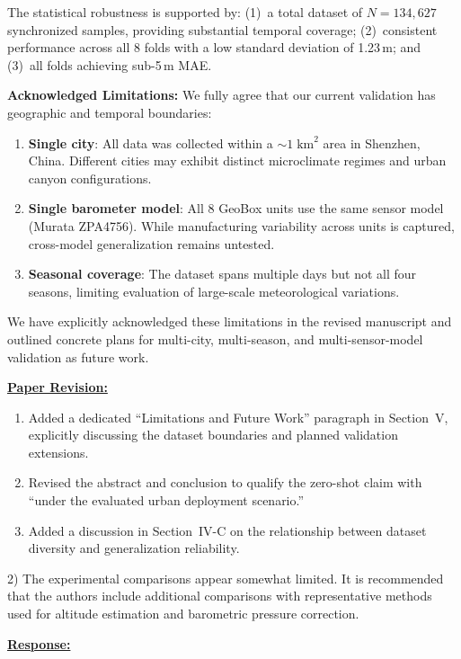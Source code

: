 The statistical robustness is supported by: (1)~a total dataset of $N = 134{,}627$ synchronized samples, providing substantial temporal coverage; (2)~consistent performance across all 8 folds with a low standard deviation of 1.23\,m; and (3)~all folds achieving sub-5\,m MAE.

\textbf{Acknowledged Limitations:}
We fully agree that our current validation has geographic and temporal boundaries:
\begin{enumerate}
    \item \textbf{Single city}: All data was collected within a ${\sim}1\;\text{km}^2$ area in Shenzhen, China. Different cities may exhibit distinct microclimate regimes and urban canyon configurations.
    \item \textbf{Single barometer model}: All 8 GeoBox units use the same sensor model (Murata ZPA4756). While manufacturing variability across units is captured, cross-model generalization remains untested.
    \item \textbf{Seasonal coverage}: The dataset spans multiple days but not all four seasons, limiting evaluation of large-scale meteorological variations.
\end{enumerate}

We have explicitly acknowledged these limitations in the revised manuscript and outlined concrete plans for multi-city, multi-season, and multi-sensor-model validation as future work.

\vspace{0.1cm}
\noindent
\underline{\textbf{Paper Revision:}}

\begin{enumerate}
    \item Added a dedicated ``Limitations and Future Work'' paragraph in Section~V, explicitly discussing the dataset boundaries and planned validation extensions.
    \item Revised the abstract and conclusion to qualify the zero-shot claim with ``under the evaluated urban deployment scenario.''
    \item Added a discussion in Section~IV-C on the relationship between dataset diversity and generalization reliability.
\end{enumerate}

\newpage

\begin{cmttwo}{}{}
2) The experimental comparisons appear somewhat limited. It is recommended that the authors include additional comparisons with representative methods used for altitude estimation and barometric pressure correction.

\end{cmttwo}
\vspace{0.1cm}
\noindent
\underline{\textbf{Response:}}
\vspace{0.2cm}

